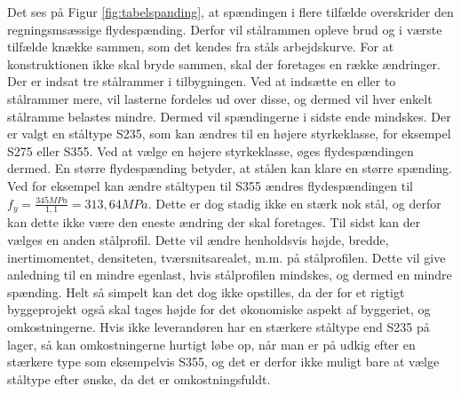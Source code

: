 Det ses på Figur \ref{fig:tabelspanding}, at spændingen i flere tilfælde overskrider den regningsmsæssige flydespænding. Derfor vil stålrammen opleve brud og i værste tilfælde knække sammen, som det kendes fra ståls arbejdskurve.
\newline 
\newline
For at konstruktionen ikke skal bryde sammen, skal der foretages en række ændringer.
\newline \indent{     }  Der er indsat tre stålrammer i tilbygningen. Ved at indsætte en eller to stålrammer mere, vil lasterne fordeles ud over disse, og dermed vil hver enkelt stålramme belastes mindre. Dermed vil spændingerne i sidste ende mindskes. 
\newline \indent{     }  Der er valgt en ståltype S235, som kan ændres til en højere styrkeklasse, for eksempel S275 eller S355. Ved at vælge en højere styrkeklasse, øges flydespændingen dermed. En større flydespænding betyder, at stålen kan klare en større spænding. Ved for eksempel kan ændre ståltypen til S355 ændres flydespændingen til $f_y = \frac{345 MPa}{1,\!1} = 313,\!64 MPa$. Dette er dog stadig ikke en stærk nok stål, og derfor kan dette ikke være den eneste ændring der skal foretages. 
\newline \indent{     }  Til sidst kan der vælges en anden stålprofil. Dette vil ændre henholdsvis højde, bredde, inertimomentet, densiteten, tværsnitsarealet, m.m. på stålprofilen. Dette vil give anledning til en mindre egenlast, hvis stålprofilen mindskes, og dermed en mindre spænding.
\newline
\newline
Helt så simpelt kan det dog ikke opstilles, da der for et rigtigt byggeprojekt også skal tages højde for det økonomiske aspekt af byggeriet, og omkostningerne. Hvis ikke leverandøren har en stærkere ståltype end S235 på lager, så kan omkostningerne hurtigt løbe op, når man er på udkig efter en stærkere type som eksempelvis S355, og det er derfor ikke muligt bare at vælge ståltype efter ønske, da det er omkostningsfuldt.